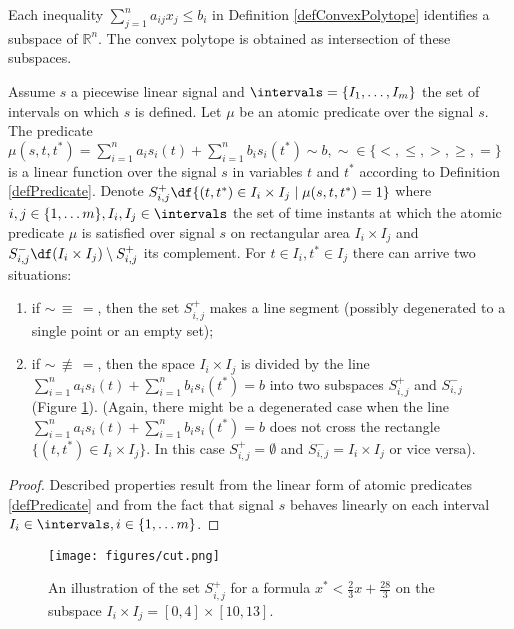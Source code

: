 Each inequality $\sum_{j=1}^n a_{ij} x_j \leq b_i$ in Definition \ref{defConvexPolytope} identifies a subspace of $\mathbb{R}^n$. The convex polytope is obtained as intersection of these subspaces.

\begin{theorem}
	\label{lemma}
	Assume $s$ a piecewise linear signal and $\intervals = \lbrace I_1, \ldots, I_m \rbrace$ the set of intervals on which $s$ is defined. Let $\mu$ be an atomic predicate over the signal $s$. The predicate $\mu(s, t, t^\ast) = \sum_{i=1}^{n} a_i s_i(t) + \sum_{i=1}^{n} b_i s_i(t^\ast) \sim b, \sim \in \lbrace <, \leq, >, \geq, = \rbrace$ is a linear function over the signal $s$ in variables $t$ and $t^\ast$ according to Definition \ref{defPredicate}. Denote $S^+_{i, j} \df \lbrace (t, t^\ast) \in I_i \times I_j \mid \mu(s, t, t^\ast) = 1 \rbrace$ where $i,j \in \lbrace 1, \ldots m \rbrace, I_i, I_j \in\intervals$ the set of time instants at which the atomic predicate $\mu$ is satisfied over signal $s$ on rectangular area $I_i \times I_j$ and $S^-_{i,j} \df (I_i \times I_j) \setminus S^+_{i,j}$ its complement. For $t \in I_i, t^\ast \in I_j$ there can arrive two situations:

\begin{enumerate}
	\item if $\sim\,\equiv\,=$, then the set $S^+_{i,j}$ makes a line segment (possibly degenerated to a single point or an empty set); 
	\item if $\sim\,\not\equiv\,=$, then the space $I_i \times I_j$ is divided by the line $\sum_{i=1}^{n} a_i s_i(t) + \sum_{i=1}^{n} b_i s_i(t^\ast) = b$ into two subspaces $S^+_{i,j}$ and $S^-_{i,j}$ (Figure \ref{figCut}). (Again, there might be a degenerated case when the line $\sum_{i=1}^{n} a_i s_i(t) + \sum_{i=1}^{n} b_i s_i(t^\ast) = b$ does not cross the rectangle $\lbrace (t, t^\ast) \in I_i \times I_j \rbrace$. In this case $S^+_{i,j} = \emptyset$ and $S^-_{i,j} = I_i \times I_j$ or vice versa).
\end{enumerate}

\begin{proof}
		Described properties result from the linear form of atomic predicates \ref{defPredicate} and from the fact that signal $s$ behaves linearly on each interval $I_i \in\intervals, i \in \lbrace 1, \ldots m \rbrace$.
	\end{proof}

\end{theorem}

\begin{figure}[h]
\vspace*{-3mm}
	\begin{center}
    \texttt{[image: figures/cut.png]}
     \caption{An illustration of the set $S^+_{i,j}$ for a formula $x^* < \frac{2}{3}x + \frac{28}{3}$ on the subspace $I_i \times I_j = [0, 4] \times [10, 13]$.}
    \label{figCut}
    \end{center}
\vspace*{-3mm}
\end{figure}


